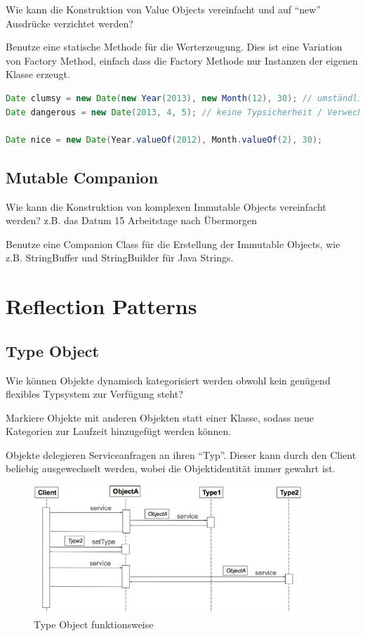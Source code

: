 Wie kann die Konstruktion von Value Objects vereinfacht und auf ``new'' Ausdrücke verzichtet werden?

Benutze eine statische Methode für die Werterzeugung. Dies ist eine Variation von Factory Method, einfach dass die Factory Methode nur Instanzen der eigenen Klasse erzeugt.

\begin{lstlisting}[language=Java, caption={Class Factory Method}]
Date clumsy = new Date(new Year(2013), new Month(12), 30); // umständlich, keine Möglichkeit um Values wiederzuverwenden
Date dangerous = new Date(2013, 4, 5); // keine Typsicherheit / Verwechslungsgefahr

Date nice = new Date(Year.valueOf(2012), Month.valueOf(2), 30);
\end{lstlisting}

\subsection{Mutable Companion}

Wie kann die Konstruktion von komplexen Immutable Objects vereinfacht werden? z.B. das Datum 15 Arbeitstage nach Übermorgen

Benutze eine Companion Class für die Erstellung der Immutable Objects, wie z.B. StringBuffer und StringBuilder für Java Strings.


\section{Reflection Patterns}

\subsection{Type Object}

Wie können Objekte dynamisch kategorisiert werden obwohl kein genügend flexibles Typsystem zur Verfügung steht?

Markiere Objekte mit anderen Objekten statt einer Klasse, sodass neue Kategorien zur Laufzeit hinzugefügt werden können.

Objekte delegieren Serviceanfragen an ihren ``Typ''. Dieser kann durch den Client beliebig ausgewechselt werden, wobei die Objektidentität immer gewahrt ist.

\begin{figure}[H]
	\centering
	\includegraphics[width=0.9\textwidth]{content/advancedPatterns/images/typeobject.png}
	\caption{Type Object funktionsweise}
\end{figure}

